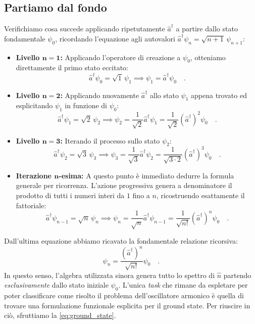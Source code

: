 \subsection{Partiamo dal fondo}
Verifichiamo cosa succede applicando ripetutamente $\hat{a}^\dagger$ a partire dallo stato fondamentale $\psi_0$, ricordando l'equazione agli autovalori $\hat{a}^\dagger\psi_n = \sqrt{n+1} \, \psi_{n+1}$:

\begin{itemize}
    \item \textbf{Livello $\bm{n = 1}$:}
    Applicando l'operatore di creazione a $\psi_0$, otteniamo direttamente il primo stato eccitato:
    \[
        \hat{a}^\dagger \psi_0 = \sqrt{1} \, \psi_1 \implies \psi_1 = \hat{a}^\dagger \psi_0 \quad.
    \]
    
    \item \textbf{Livello $\bm{n = 2}$:}
    Applicando nuovamente $\hat{a}^\dagger$ allo stato $\psi_1$ appena trovato ed esplicitando $\psi_1$ in funzione di $\psi_0$:
    \[
        \hat{a}^\dagger \psi_1 = \sqrt{2} \, \psi_2 \implies \psi_2 = \frac{1}{\sqrt{2}}\hat{a}^\dagger \psi_1 = \frac{1}{\sqrt{2}} (\hat{a}^\dagger)^2 \psi_0 \quad.
    \]
    
    \item \textbf{Livello $\bm{n = 3}$:}
    Iterando il processo sullo stato $\psi_2$:
    \[
        \hat{a}^\dagger \psi_2 = \sqrt{3} \, \psi_3 \implies \psi_3 = \frac{1}{\sqrt{3}}\hat{a}^\dagger \psi_2 = \frac{1}{\sqrt{3\cdot 2}} (\hat{a}^\dagger)^3 \psi_0 \quad.
    \]
    
    \item \textbf{Iterazione $\bm{n}$-esima:}
    A questo punto è immediato dedurre la formula generale per ricorrenza. L'azione progressiva genera a denominatore il prodotto di tutti i numeri interi da $1$ fino a $n$, ricostruendo esattamente il fattoriale:
    \[
        \hat{a}^\dagger \psi_{n-1} = \sqrt{n} \, \psi_n \implies \psi_n = \frac{1}{\sqrt{n}} \hat{a}^\dagger \psi_{n-1} = \frac{1}{\sqrt{n!}} (\hat{a}^\dagger)^n \psi_0 \quad.
    \]
\end{itemize}

Dall'ultima equazione abbiamo ricavato la fondamentale relazione ricorsiva:
\begin{equation}
    \psi_n = \frac{(\hat{a}^\dagger)^n}{\sqrt{n!}}\psi_0 \quad.
\end{equation}
In questo senso, l'algebra utilizzata sinora genera tutto lo spettro di $\hat{n}$ partendo \emph{esclusivamente} dallo stato iniziale $\psi_0$. L'unica \emph{task} che rimane da espletare per poter classificare come risolto il problema dell'oscillatore armonico è quella di trovare una formulazione funzionale esplicita per il ground state. Per riuscire in ciò, sfruttiamo la \eqref{eq:ground_state}.

